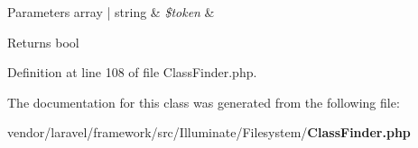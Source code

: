 \begin{DoxyParams}[1]{Parameters}
array | string & {\em \$token} & \\
\hline
\end{DoxyParams}
\begin{DoxyReturn}{Returns}
bool 
\end{DoxyReturn}


Definition at line 108 of file Class\+Finder.\+php.



The documentation for this class was generated from the following file\+:\begin{DoxyCompactItemize}
\item 
vendor/laravel/framework/src/\+Illuminate/\+Filesystem/{\bf Class\+Finder.\+php}\end{DoxyCompactItemize}
